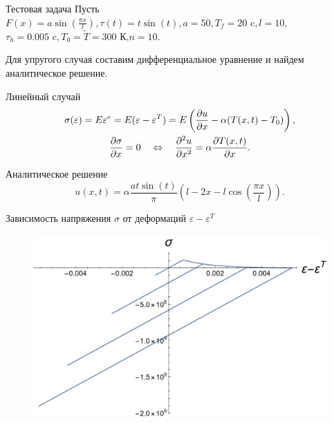 \documentclass{beamer}
\begin{document}
	\begin{frame}{Тестовая задача}
		\mbox{Пусть $F(x) = a \sin\left(\frac{\pi x}{l}\right), \tau(t) = t\sin(t), a = 50, T_f = 20 \text{ c}, l=10,$}\\$\tau_h = 0.005\text{ c}, T_0 = \tilde T=300\text{ К,} n=10.$
		
		 Для упругого случая составим дифференциальное уравнение и найдем аналитическое решение.
		\begin{block}{Линейный случай}
		\begin{gather*}
			\sigma(\varepsilon) = E\varepsilon^e=E(\varepsilon-\varepsilon^T)=E\left(\frac{\partial u}{\partial x}-\alpha(T(x,t)-T_0)\right),\\
			\frac{\partial \sigma}{\partial x} = 0 \quad \Leftrightarrow \quad \frac{\partial^2u}{\partial x^2} = \alpha \frac{\partial T(x,t)}{\partial x}.
		\end{gather*}
	\end{block}
	\begin{block}{Аналитическое решение}
			\[
			u(x, t) = \alpha\frac{ a t \sin(t)}{\pi}\left(l-2x-l\cos\left(\frac{\pi x}{l}\right)\right).
			\]
		\end{block}
	\end{frame}
	
	\begin{frame}{Зависимость напряжения $\sigma$ от деформаций $\varepsilon-\varepsilon^T$}
		\begin{figure}[H]
			\centering
			\includegraphics[width=1\textwidth]{T1_4}
		\end{figure}
	\end{frame}
	
\end{document}
